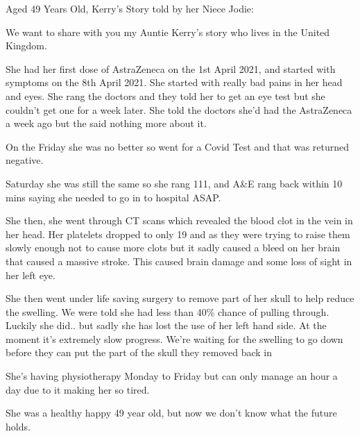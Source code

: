 Aged 49 Years Old, Kerry’s Story told by her Niece Jodie:

We want to share with you my Auntie Kerry’s story who lives in the United
Kingdom.

She had her first dose of AstraZeneca on the 1st April 2021, and started with
symptoms on the 8th April 2021. She started with really bad pains in her head
and eyes. She rang the doctors and they told her to get an eye test but she
couldn’t get one for a week later. She told the doctors she’d had the
AstraZeneca a week ago but the said nothing more about it.

On the Friday she was no better so went for a Covid Test and that was returned
negative.

Saturday she was still the same so she rang 111, and A\&E rang back within 10
mins saying she needed to go in to hospital ASAP.

She then, she went through CT scans which revealed the blood clot in the vein in
her head. Her platelets dropped to only 19 and as they were trying to raise them
slowly enough not to cause more clots but it sadly caused a bleed on her brain
that caused a massive stroke. This caused brain damage and some loss of sight in
her left eye.

She then went under life saving surgery to remove part of her skull to help
reduce the swelling. We were told she had less than 40\% chance of pulling
through. Luckily she did.. but sadly she has lost the use of her left hand side.
At the moment it’s extremely slow progress. We’re waiting for the swelling to go
down before they can put the part of the skull they removed back in

She’s having physiotherapy Monday to Friday but can only manage an hour a day
due to it making her so tired.

She was a healthy happy 49 year old, but now we don’t know what the future
holds.

